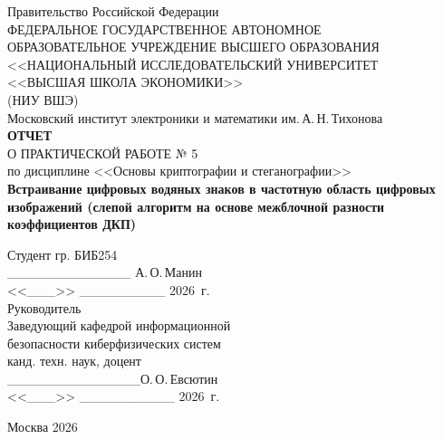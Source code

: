 \documentclass[12pt,a4paper]{article}
\begin{document}
\renewcommand{\contentsname}{СОДЕРЖАНИЕ}
\renewcommand{\figurename}{Рисунок}
\renewcommand{\tablename}{Таблица}

\makeatletter
\renewcommand{\thesection}{\arabic{section}}
\renewcommand{\thesubsection}{\thesection.\arabic{subsection}}
\renewcommand{\thesubsubsection}{\thesubsection.\arabic{subsubsection}}
\renewcommand\@seccntformat[1]{\csname the#1\endcsname\quad}
\makeatother

\begin{titlepage}
\thispagestyle{empty}
\begin{center}
Правительство Российской Федерации\\
ФЕДЕРАЛЬНОЕ ГОСУДАРСТВЕННОЕ АВТОНОМНОЕ\\
ОБРАЗОВАТЕЛЬНОЕ УЧРЕЖДЕНИЕ ВЫСШЕГО ОБРАЗОВАНИЯ\\
<<НАЦИОНАЛЬНЫЙ ИССЛЕДОВАТЕЛЬСКИЙ УНИВЕРСИТЕТ\\
<<ВЫСШАЯ ШКОЛА ЭКОНОМИКИ>>\\
(НИУ ВШЭ)\\[4pt]
Московский институт электроники и математики им.\,А.\,Н.\,Тихонова\\[40pt]

{\large \textbf{ОТЧЕТ}}\\[4pt]
{\large О ПРАКТИЧЕСКОЙ РАБОТЕ № 5}\\[4pt]
по дисциплине <<Основы криптографии и стеганографии>>\\[10pt]
\textbf{Встраивание цифровых водяных знаков в частотную область цифровых изображений (слепой алгоритм на основе межблочной разности коэффициентов ДКП)}\\[50pt]
\end{center}

\begin{flushright}
\begin{minipage}{0.45\textwidth}
\raggedright
Студент гр. БИБ254\\
\_\_\_\_\_\_\_\_\_\_\_\_\_ А.\,О.\,Манин\\[8pt]
<<\_\_\_>> \_\_\_\_\_\_\_\_\_ 2026~г.\\[20pt]
Руководитель\\
Заведующий кафедрой информационной\\
безопасности киберфизических систем\\
канд. техн. наук, доцент\\
\_\_\_\_\_\_\_\_\_\_\_\_\_\_О.\,О.\,Евсютин\\[8pt]
<<\_\_\_>> \_\_\_\_\_\_\_\_\_\_ 2026~г.
\end{minipage}
\end{flushright}

\vfill
\begin{center}
Москва 2026
\end{center}
\end{titlepage}
\end{document}
